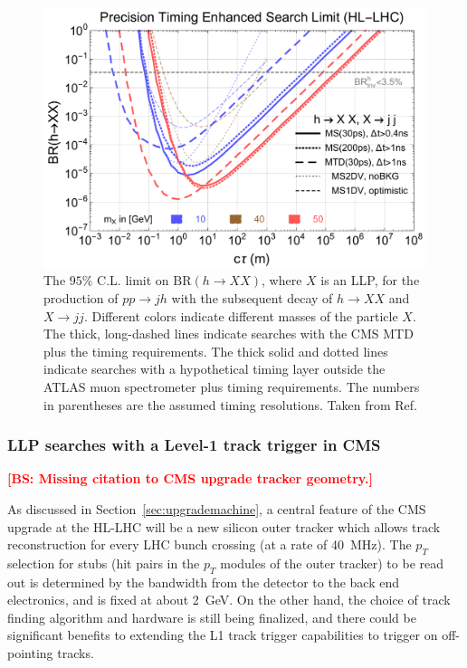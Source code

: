 \begin{figure}[ht]
    \centering
    \includegraphics[width=1.0\columnwidth]{figures/MTD/10-20-50-MC-Lcalc-BRlimit-with-deltaT-cut-MS-1ns.pdf}
    \caption{The $95\%$ C.L. limit on $\text{BR}(h \to XX)$, where $X$ is an LLP, for the production of $pp \to j h$ with the subsequent decay of $h\to X X$ and $X \to j j$. Different colors indicate different masses of the particle $X$. The thick, long-dashed lines indicate searches with the CMS MTD plus the timing requirements. The thick solid and dotted lines indicate searches with a hypothetical timing layer outside the ATLAS muon spectrometer plus timing requirements. The numbers in parentheses are the assumed timing resolutions. Taken from Ref.~\cite{Liu:2018wte}}
    \label{fig:ctaulimitHiggs}
\end{figure}

\subsubsection{LLP searches with a Level-1 track trigger in CMS}

{\bf \textcolor{red}{[BS: Missing citation to CMS upgrade tracker geometry.]}}

As discussed in Section~\ref{sec:upgrademachine}, a central feature of the CMS upgrade at the HL-LHC will be a new silicon outer tracker which allows track reconstruction for every LHC bunch crossing (at a rate of 40~MHz). The $p_T$ selection for stubs (hit pairs in the $p_T$ modules of the outer tracker) to be read out is determined by the bandwidth from the detector to the back end electronics, and is fixed at about 2~GeV. On the other hand, the choice of track finding algorithm and hardware is still being finalized, and there could be significant benefits to extending the L1 track trigger capabilities to trigger on off-pointing tracks. 

